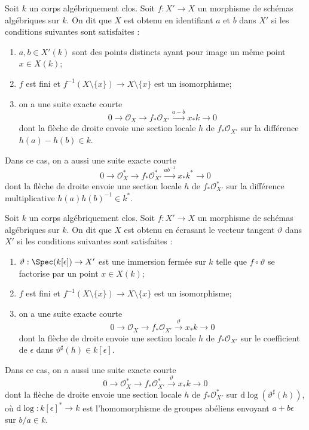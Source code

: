 \begin{example} \label{example-glue-points} Soit $k$ un corps algébriquement clos. Soit $f : X' \to X$ un morphisme de schémas algébriques sur $k$. On dit que $X$ est obtenu en identifiant $a$ et $b$ dans $X'$ si les conditions suivantes sont satisfaites : \begin{enumerate} \item $a, b \in X'(k)$ sont des points distincts ayant pour image un même point $x \in X(k)$; \item $f$ est fini et $f^{-1}(X \setminus \{x\}) \to X \setminus \{x\}$ est un isomorphisme; \item on a une suite exacte courte $$
0 \to \mathcal{O}_X \to f_*\mathcal{O}_{X'} \xrightarrow{a - b} x_*k \to 0
$$ dont la flèche de droite envoie une section locale $h$ de $f_*\mathcal{O}_{X'}$ sur la différence $h(a) - h(b) \in k$. \end{enumerate} Dans ce cas, on a aussi une suite exacte courte $$
0 \to \mathcal{O}_X^* \to f_*\mathcal{O}_{X'}^*
\xrightarrow{ab^{-1}} x_*k^* \to 0
$$ dont la flèche de droite envoie une section locale $h$ de $f_*\mathcal{O}_{X'}^*$ sur la différence multiplicative $h(a)h(b)^{-1} \in k^*$.
\end{example}

\begin{example} \label{example-squish-tangent-vector} Soit $k$ un corps algébriquement clos. Soit $f : X' \to X$ un morphisme de schémas algébriques sur $k$. On dit que $X$ est obtenu en écrasant le vecteur tangent $\vartheta$ dans $X'$ si les conditions suivantes sont satisfaites : \begin{enumerate} \item $\vartheta : \Spec(k[\epsilon]) \to X'$ est une immersion fermée sur $k$ telle que $f \circ \vartheta$ se factorise par un point $x \in X(k)$; \item $f$ est fini et $f^{-1}(X \setminus \{x\}) \to X \setminus \{x\}$ est un isomorphisme; \item on a une suite exacte courte $$
0 \to \mathcal{O}_X \to f_*\mathcal{O}_{X'} \xrightarrow{\vartheta} x_*k \to 0
$$ dont la flèche de droite envoie une section locale $h$ de $f_*\mathcal{O}_{X'}$ sur le coefficient de $\epsilon$ dans $\vartheta^\sharp(h) \in k[\epsilon]$. \end{enumerate} Dans ce cas, on a aussi une suite exacte courte $$
0 \to \mathcal{O}_X^* \to f_*\mathcal{O}_{X'}^*
\xrightarrow{\vartheta} x_*k \to 0
$$ dont la flèche de droite envoie une section locale $h$ de $f_*\mathcal{O}_{X'}^*$ sur $\text{d}\log(\vartheta^\sharp(h))$, où $\text{d}\log : k[\epsilon]^* \to k$ est l'homomorphisme de groupes abéliens envoyant $a + b\epsilon$ sur $b/a \in k$.
\end{example}

